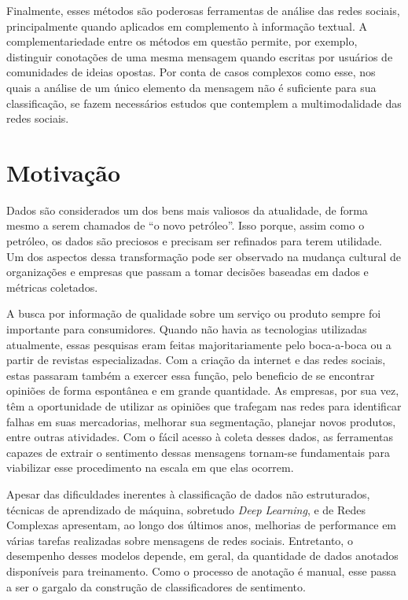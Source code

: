 Finalmente, esses métodos são poderosas ferramentas de análise das redes sociais,
principalmente quando aplicados em complemento à informação textual.
A complementariedade entre os métodos em questão permite, por exemplo, distinguir
conotações de uma mesma mensagem quando escritas por usuários de comunidades de
ideias opostas.
Por conta de casos complexos como esse, nos quais a análise de um único elemento
da mensagem não é suficiente para sua classificação, se fazem necessários
estudos que contemplem a multimodalidade das redes sociais.

\section{Motivação}

Dados são considerados um dos bens mais valiosos da atualidade, de forma mesmo a
serem chamados de ``o novo petróleo''.
Isso porque, assim como o petróleo, os dados são preciosos e precisam ser refinados
para terem utilidade.
Um dos aspectos dessa transformação pode ser observado na mudança cultural de
organizações e empresas que passam a tomar decisões baseadas em dados e métricas
coletados.

A busca por informação de qualidade sobre um serviço ou produto sempre foi
importante para consumidores.
Quando não havia as tecnologias utilizadas atualmente, essas pesquisas eram feitas
majoritariamente pelo boca-a-boca ou a partir de revistas especializadas.
Com a criação da internet e das redes sociais, estas passaram também a exercer
essa função, pelo beneficio de se encontrar opiniões de forma espontânea e em
grande quantidade.
As empresas, por sua vez, têm a oportunidade de utilizar as opiniões que
trafegam nas redes para identificar falhas em suas mercadorias, melhorar sua
segmentação, planejar novos produtos, entre outras atividades.
Com o fácil acesso à coleta desses dados, as ferramentas capazes de extrair o
sentimento dessas mensagens tornam-se fundamentais para viabilizar esse
procedimento na escala em que elas ocorrem.

Apesar das dificuldades inerentes à classificação de dados não estruturados,
técnicas de aprendizado de máquina, sobretudo \textit{Deep Learning}, e de Redes
Complexas apresentam, ao longo dos últimos anos, melhorias de performance em várias
tarefas realizadas sobre mensagens de redes sociais.
Entretanto, o desempenho desses modelos depende, em geral, da quantidade de dados
anotados disponíveis para treinamento.
Como o processo de anotação é manual, esse passa a ser o gargalo da construção de
classificadores de sentimento.

